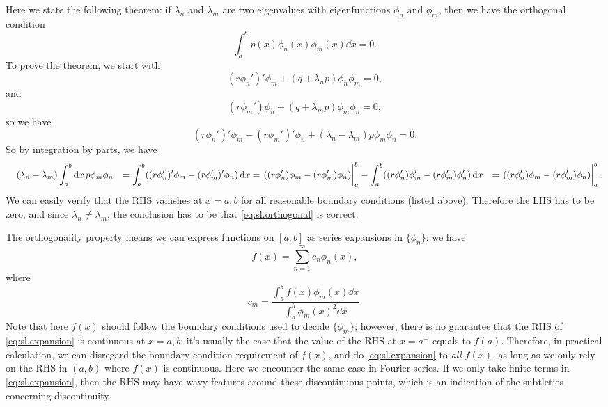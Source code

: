 \documentclass[hyperref, a4paper]{article}
\def\\{}%
\begin{document}
Here we state the following theorem:
if $\lambda_n$ and $\lambda_m$ are two eigenvalues with eigenfunctions $\phi_n$ and $\phi_m$,
then we have the orthogonal condition
\begin{equation}
    \int_{a}^{b} p(x) \phi_n(x) \phi_m(x) \dd{x} = 0.
    \label{eq:sl.orthogonal}
\end{equation}
To prove the theorem, we start with 
\[
    (r \phi_n')' \phi_m + (q + \lambda_n p) \phi_n \phi_m = 0,
\]
and 
\[
    (r \phi_m') \phi_n + (q + \lambda_m p) \phi_m \phi_n = 0,
\]
so we have 
\[
    (r \phi_n')' \phi_m 
    - (r \phi_m')' \phi_n 
    + (\lambda_n - \lambda_m) p \phi_m \phi_n = 0.
\]
So by integration by parts, we have 
\[
    \begin{aligned}
        &\quad (\lambda_n - \lambda_m) \int_{a}^{b} \dd{x} p \phi_m \phi_n   \\
        &= \int_{a}^{b} ((r \phi_n')' \phi_m 
        - (r \phi_m')' \phi_n ) \dd{x} \\
        &= \eval{
            ((r \phi_n') \phi_m 
            - (r \phi_m') \phi_n )
        }_a^b - 
        \int_{a}^{b} ((r \phi_n') \phi_m'
        - (r \phi_m') \phi_n' ) \dd{x} \\
        &= \eval{
            ((r \phi_n') \phi_m 
            - (r \phi_m') \phi_n )
        }_a^b.
    \end{aligned}
\]
We can easily verify that the RHS vanishes at $x = a, b$
for all reasonable boundary conditions 
(listed above). 
Therefore the LHS has to be zero, 
and since $\lambda_n \neq \lambda_m$,
the conclusion has to be that 
\eqref{eq:sl.orthogonal} is correct. 

The orthogonality property means we can express functions on $[a, b]$ 
as series expansions in $\{\phi_n\}$: 
we have 
\begin{equation}
    f(x) = \sum_{n=1}^{\infty} c_n \phi_n(x),
    \label{eq:sl.expansion}
\end{equation}
where 
\begin{equation}
    c_m = \frac{
        \int_{a}^{b} f(x) \phi_m(x) \dd{x}
    }{
        \int_{a}^{b} \phi_m(x)^2 \dd{x}
    }.
\end{equation}
Note that here $f(x)$ should follow the boundary conditions used to decide $\{\phi_m\}$;
however, there is no guarantee that 
the RHS of \eqref{eq:sl.expansion} is continuous at $x = a, b$:
it's usually the case that the value of the RHS at $x = a^+$
equals to $f(a)$.
Therefore, in practical calculation, 
we can disregard the boundary condition requirement of $f(x)$,
and do \eqref{eq:sl.expansion} to \emph{all} $f(x)$,
as long as we only rely on the RHS 
in $(a, b)$ where $f(x)$ is continuous.
Here we encounter the same case in Fourier series.
If we only take finite terms in \eqref{eq:sl.expansion}, 
then the RHS may have wavy features around these discontinuous points, 
which is an indication of the subtleties concerning discontinuity.
\end{document}
